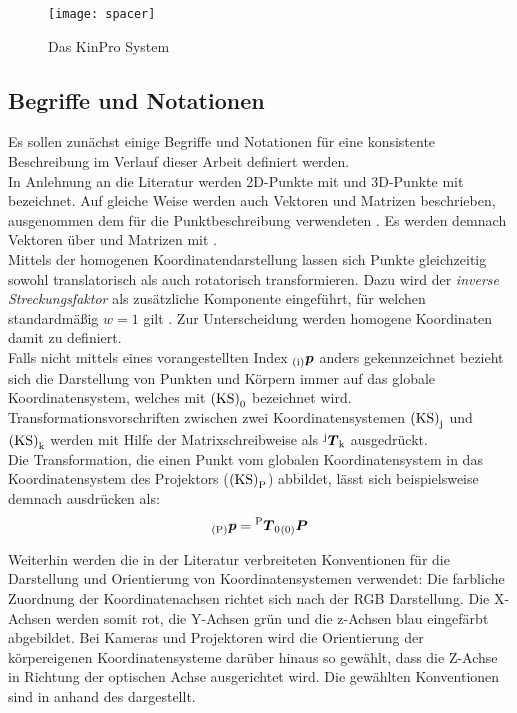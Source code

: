 \begin{figure}[ht]
	\begin{center}
		\texttt{[image: spacer]}
		\caption{Das KinPro System}
		\label{fig.kinpro}
	\end{center}
\end{figure}

\subsection{Begriffe und Notationen}
Es sollen zunächst einige Begriffe und Notationen für eine konsistente Beschreibung im Verlauf dieser Arbeit definiert werden.\\
In Anlehnung an die Literatur \cite{Zhang2000} werden 2D-Punkte mit  und 3D-Punkte mit  bezeichnet. Auf gleiche Weise werden auch Vektoren und Matrizen beschrieben, ausgenommen dem für die Punktbeschreibung verwendeten \red[Buchstaben P]. Es werden demnach Vektoren über  und Matrizen mit  \red[beschrieben].\\
Mittels der homogenen Koordinatendarstellung lassen sich Punkte gleichzeitig sowohl translatorisch als auch rotatorisch transformieren. Dazu wird der \textit{inverse Streckungsfaktor} als zusätzliche Komponente eingeführt, für welchen standardmäßig $w=1$ gilt \cite{Nischwitz20111}. Zur Unterscheidung werden homogene Koordinaten damit zu  \red[bzw.]  definiert.\\
Falls nicht mittels eines vorangestellten Index ${_{{\mathrm{(i)}}}}\mbox{\boldmath{$p$}}$ anders gekennzeichnet bezieht sich die Darstellung von Punkten und Körpern immer auf das globale Koordinatensystem, welches mit ${\mathrm{(KS)}}_{\mathrm{0}}$ bezeichnet wird. Transformationsvorschriften zwischen zwei Koordinatensystemen ${\mathrm{(KS)}}_{\mathrm{j}}$ und ${\mathrm{(KS)}}_{\mathrm{k}}$ werden mit Hilfe der Matrixschreibweise als ${^{\mathrm{j}}\mbox{\boldmath{$T$}}_{\mathrm{k}}}$ ausgedrückt.\\
Die Transformation, die einen Punkt vom globalen Koordinatensystem in das Koordinatensystem des Projektors (${\mathrm{(KS)}}_{\mathrm{P}}$) abbildet, lässt sich beispielsweise demnach ausdrücken als:
\red[\\P oder p? in 0]
\begin{equation}
{_{{\mathrm{(P)}}}}\mbox{\boldmath{$p$}} = {^{\mathrm{P}}\mbox{\boldmath{$T$}}_{\mathrm{0}}}{_{{\mathrm{(0)}}}}\mbox{\boldmath{$P$}}
\end{equation}

Weiterhin werden die in der Literatur verbreiteten Konventionen für die Darstellung und Orientierung von Koordinatensystemen verwendet: Die farbliche Zuordnung der Koordinatenachsen richtet sich nach der RGB Darstellung. Die X-Achsen werden somit rot, die Y-Achsen grün und die z-Achsen blau eingefärbt abgebildet. Bei Kameras und Projektoren wird die Orientierung der körpereigenen Koordinatensysteme darüber hinaus so gewählt, dass die Z-Achse in Richtung der optischen Achse ausgerichtet wird. Die gewählten Konventionen sind in  anhand des  dargestellt.

